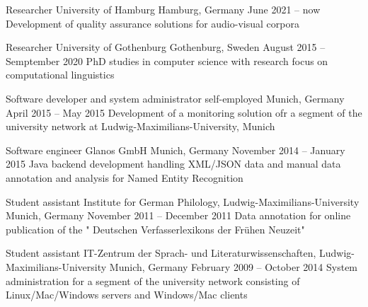 \documentclass[11pt, a4]{academic-cv}
\begin{document}
\begin{cventries}
\cventry
{Researcher} %
{ University of Hamburg} %
{Hamburg, Germany} %
{June 2021 -- now} %
{
Development of quality assurance solutions for audio-visual corpora
}

\cventry
{Researcher} %
{ University of Gothenburg} %
{Gothenburg, Sweden} %
{August 2015 -- Semptember 2020} %
{
PhD studies in computer science with research focus on computational linguistics
}

\cventry
{Software developer and system administrator} %
{self-employed} %
{Munich, Germany} %
{April 2015 -- May 2015} %
{
Development of a monitoring solution ofr a segment of the university network at Ludwig-Maximilians-University, Munich
}

\cventry
{Software engineer} %
{ Glanos GmbH} %
{Munich, Germany} %
{November 2014 -- January 2015} %
{
Java backend development handling XML/JSON data and manual data annotation and analysis for Named Entity Recognition
}

\cventry
{Student assistant} %
{ Institute for German Philology, Ludwig-Maximilians-University} %
{Munich, Germany} %
{November 2011 -- December 2011} %
{
Data annotation for online publication of the " Deutschen Verfasserlexikons der Frühen Neuzeit"
}

\cventry
{Student assistant} %
{ IT-Zentrum der Sprach- und Literaturwissenschaften, Ludwig-Maximilians-University} %
{Munich, Germany} %
{February 2009 -- October 2014} %
{
System administration for a segment of the university network consisting of Linux/Mac/Windows servers and Windows/Mac clients
}

\end{cventries}
\vspace{-10px}
\end{document}
